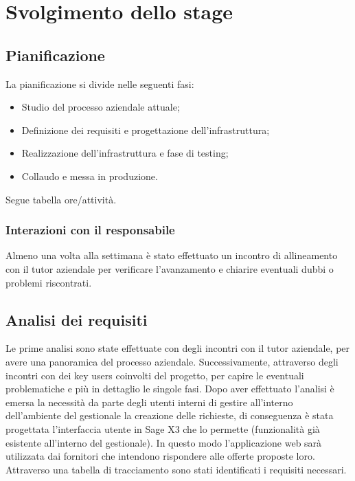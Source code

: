 
\chapter{Svolgimento dello stage}
\label{cap:svolgimento-dello-stage}


\section{Pianificazione}

La pianificazione si divide nelle seguenti fasi:
\begin{itemize}
	\item Studio del processo aziendale attuale;
	\item Definizione dei requisiti e progettazione dell’infrastruttura;
	\item Realizzazione dell’infrastruttura e fase di testing;
	\item Collaudo e messa in produzione.
\end{itemize}
Segue tabella ore/attività.



\subsection{Interazioni con il responsabile}

Almeno una volta alla settimana è stato effettuato un incontro di allineamento con il tutor aziendale per verificare l’avanzamento e chiarire eventuali dubbi o problemi
riscontrati.




\section{Analisi dei requisiti}

Le prime analisi sono state effettuate con degli incontri con il tutor aziendale, per avere una panoramica del processo aziendale. Successivamente, attraverso degli incontri con dei key users coinvolti del progetto, per capire le eventuali problematiche e più in dettaglio le singole fasi.
Dopo aver effettuato l’analisi è emersa la necessità da parte degli utenti interni di gestire all’interno dell’ambiente del gestionale la creazione delle richieste, di conseguenza è stata progettata l’interfaccia utente in Sage X3 che lo permette (funzionalità già esistente all’interno del gestionale). In questo modo l’applicazione web sarà utilizzata dai fornitori che intendono rispondere alle offerte proposte loro.
Attraverso una tabella di tracciamento sono stati identificati i requisiti necessari.

